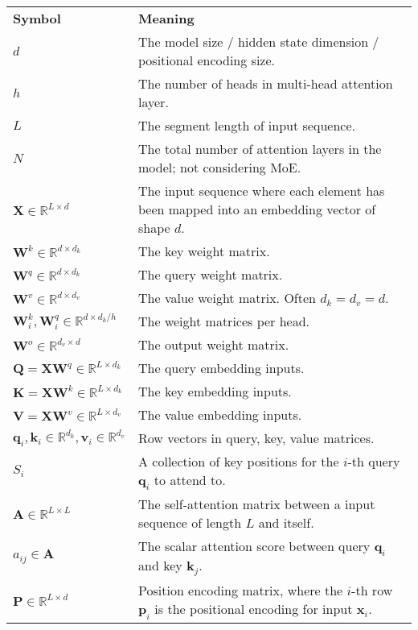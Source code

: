\documentclass[12pt]{article}
\begin{document}
\begin{table}[h!]
\centering
\tiny
\begin{tabular}{ll}
\textbf{Symbol} & \textbf{Meaning} \\
$d$ & The model size / hidden state dimension / positional encoding size. \\
$h$ & The number of heads in multi-head attention layer. \\
$L$ & The segment length of input sequence. \\
$N$ & The total number of attention layers in the model; not considering MoE. \\
$\mathbf{X} \in \mathbb{R}^{L \times d}$ & The input sequence where each element has been mapped into an embedding vector of shape $d$. \\
$\mathbf{W}^k \in \mathbb{R}^{d \times d_k}$ & The key weight matrix. \\
$\mathbf{W}^q \in \mathbb{R}^{d \times d_k}$ & The query weight matrix. \\
$\mathbf{W}^v \in \mathbb{R}^{d \times d_v}$ & The value weight matrix. Often $d_k = d_v = d$. \\
$\mathbf{W}^k_i, \mathbf{W}^q_i \in \mathbb{R}^{d \times d_k/h}$ & The weight matrices per head. \\
$\mathbf{W}^o \in \mathbb{R}^{d_v \times d}$ & The output weight matrix. \\
$\mathbf{Q} = \mathbf{X}\mathbf{W}^q \in \mathbb{R}^{L \times d_k}$ & The query embedding inputs. \\
$\mathbf{K} = \mathbf{X}\mathbf{W}^k \in \mathbb{R}^{L \times d_k}$ & The key embedding inputs. \\
$\mathbf{V} = \mathbf{X}\mathbf{W}^v \in \mathbb{R}^{L \times d_v}$ & The value embedding inputs. \\
$\mathbf{q}_i, \mathbf{k}_i \in \mathbb{R}^{d_k}, \mathbf{v}_i \in \mathbb{R}^{d_v}$ & Row vectors in query, key, value matrices. \\
$S_i$ & A collection of key positions for the $i$-th query $\mathbf{q}_i$ to attend to. \\
$\mathbf{A} \in \mathbb{R}^{L \times L}$ & The self-attention matrix between a input sequence of length $L$ and itself. \\
$a_{ij} \in \mathbf{A}$ & The scalar attention score between query $\mathbf{q}_i$ and key $\mathbf{k}_j$. \\
$\mathbf{P} \in \mathbb{R}^{L \times d}$ & Position encoding matrix, where the $i$-th row $\mathbf{p}_i$ is the positional encoding for input $\mathbf{x}_i$. \\
\end{tabular}
\end{table}
\end{document}
